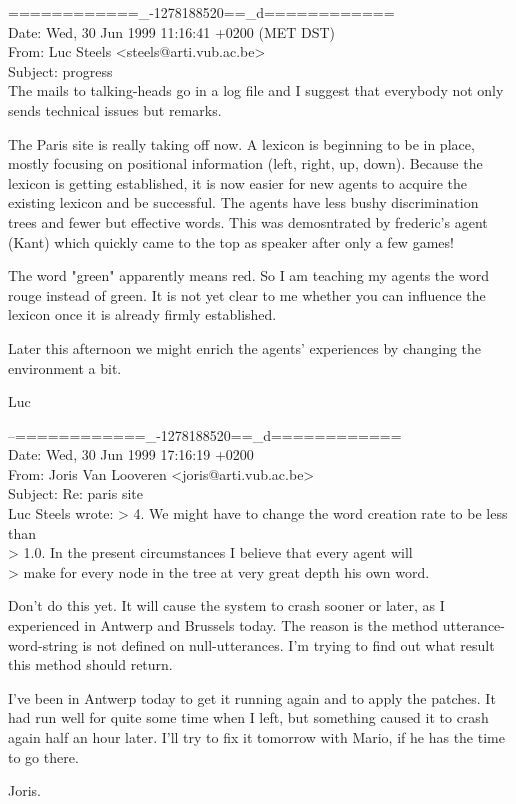 \begin{mail}
============\_-1278188520==\_d============\\
Date: Wed, 30 Jun 1999 11:16:41 +0200 (MET DST)\\
From: Luc Steels <steels@arti.vub.ac.be>\\
Subject: progress \\

The mails to talking-heads go in a log file and I suggest that everybody not 
only sends technical issues but remarks.

The Paris site is really taking off now. A lexicon is beginning to 
be in place, mostly focusing on positional information (left, right, up, 
down). Because the lexicon is getting established, it is now easier for
new agents to acquire the existing lexicon and be successful. The agents have less
bushy discrimination trees and fewer but effective words. This was demosntrated
by frederic's agent (Kant) which quickly came to the top as speaker after only a
few games!

The word "green" apparently means red. So I am teaching my agents the word
rouge instead of green. It is not yet clear to me whether you can influence 
the lexicon once it is already firmly established.

Later this afternoon we might enrich the agents' experiences by changing the
environment a bit.

Luc
\end{mail}

\begin{mail}
--============\_-1278188520==\_d============\\
Date: Wed, 30 Jun 1999 17:16:19 +0200\\
From: Joris Van Looveren <joris@arti.vub.ac.be>\\
Subject: Re: paris site\\

Luc Steels wrote:
> 4. We might have to change the word creation rate to be less than 
\\> 1.0. In the present circumstances I believe that every agent will 
\\> make for every node in the tree at very great depth his own word.

Don't do this yet. It will cause the system to crash sooner or later, as
I experienced in Antwerp and Brussels today. The reason is the method
utterance-word-string is not defined on null-utterances. I'm trying to
find out what result this method should return.

I've been in Antwerp today to get it running again and to apply the
patches. It had run well for quite some time when I left, but something
caused it to crash again half an hour later. I'll try to fix it tomorrow
with Mario, if he has the time to go there.

Joris.
\end{mail}


